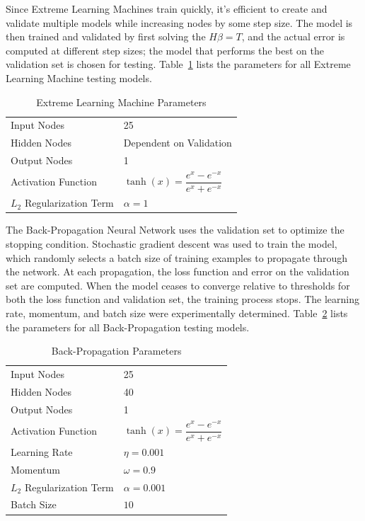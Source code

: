 \documentclass{ncjms}
\begin{document}
	Since Extreme Learning Machines train quickly, it's efficient to create and validate multiple models while increasing nodes by some step size.
	The model is then trained and validated by first solving the $H\beta=T$, and the actual error is computed at different step sizes; the model that performs the best on the validation set is chosen for testing.
	Table~\ref{tab:elm-param} lists the parameters for all Extreme Learning Machine testing models.

	\begin{table}
	\caption{Extreme Learning Machine Parameters}
	\label{tab:elm-param}
		\begin{tabular}{ll}
		\toprule
		Input Nodes			   & 25 \\
		Hidden Nodes           & Dependent on Validation \\
		Output Nodes		   & 1 \\
		Activation Function    & $\tanh(x)=\dfrac{e^x - e^{-x}}{e^x + e^{-x}}$\\
		$L_2$ Regularization Term & $\alpha=1$\\
		\bottomrule
		\end{tabular}
	\end{table}

	The Back-Propagation Neural Network uses the validation set to optimize the stopping condition.
	Stochastic gradient descent was used to train the model, which randomly selects a batch size of training examples to propagate through the network.
	At each propagation, the loss function and error on the validation set are computed.
	When the model ceases to converge relative to thresholds for both the loss function and validation set, the training process stops.
	The learning rate, momentum, and batch size were experimentally determined.
	Table~\ref{tab:bp-param} lists the parameters for all Back-Propagation testing models.

	\begin{table}
	\caption{Back-Propagation Parameters}
	\label{tab:bp-param}
		\begin{tabular}{ll}
		\toprule
		Input Nodes			   & 25 \\
		Hidden Nodes           & 40 \\
		Output Nodes		   & 1 \\
		Activation Function    & $\tanh(x)=\dfrac{e^x - e^{-x}}{e^x + e^{-x}}$\\
		Learning Rate          & $\eta=0.001$\\
		Momentum               & $\omega=0.9$\\
		$L_2$ Regularization Term & $\alpha=0.001$\\
		Batch Size             & $10$ \\
		\bottomrule
		\end{tabular}
	\end{table}
\end{document}
